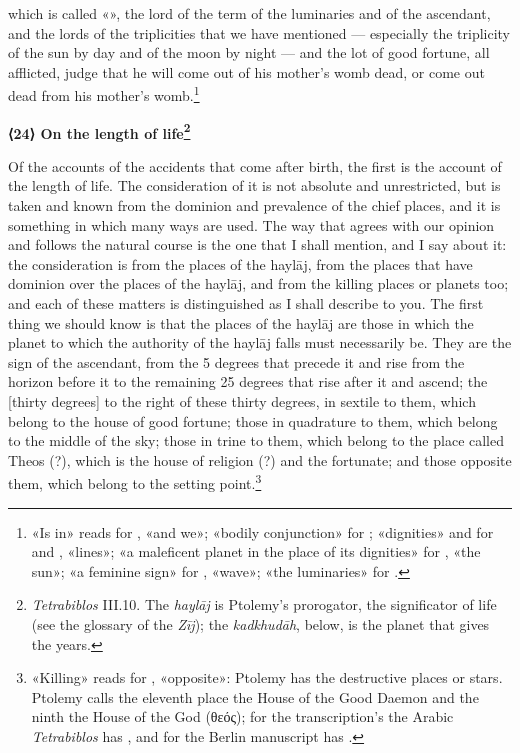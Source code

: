 \documentclass[11pt]{article}
\newcommand{\Fol}[1]{\marginpar{\footnotesize\color{gray}f.\,#1}}
\newcommand{\ChapterHead}[4]{\par\needspace{8\baselineskip}\bigskip\pdfbookmark[1]{#1}{ch-#2}\hypertarget{EN-K#2}{}%
 {\large\bfseries\interlinepenalty=10000 #1#4{\normalfont\normalsize#3}\par}\nobreak\medskip}
\begin{document}
which is called «», the lord of the term of the luminaries and of the ascendant, and the lords of the triplicities that we have mentioned — especially the triplicity of the sun by day and of the moon by night — and the lot of good fortune, all afflicted, judge that he will come out of his mother's womb dead, or come out dead from his mother's womb.\footnote{«Is in» reads  for , «and we»; «bodily conjunction»  for ; «dignities»  and  for  and , «lines»; «a maleficent planet in the place of its dignities»  for , «the sun»; «a feminine sign»  for , «wave»; «the luminaries»  for .}\par
\ChapterHead{{\mdseries ⟨}24{\mdseries ⟩} On the length of life}{24}{}{\footnote{\emph{Tetrabiblos} III.10. The \emph{haylāj} is Ptolemy's prorogator, the significator of life (see the glossary of the \emph{Zīj}); the \emph{kadkhudāh}, below, is the planet that gives the years.}}
\par \Fol{45v}Of the accounts of the accidents that come after birth, the first is the account of the length of life. The consideration of it is not absolute and unrestricted, but is taken and known from the dominion and prevalence of the chief places, and it is something in which many ways are used. The way that agrees with our opinion and follows the natural course is the one that I shall mention, and I say about it: the consideration is from the places of the haylāj, from the places that have dominion over the places of the haylāj, and from the killing places or planets too; and each of these matters is distinguished as I shall describe to you. The first thing we should know is that the places of the haylāj are those in which the planet to which the authority of the haylāj falls must necessarily be. They are the sign of the ascendant, from the 5 degrees that precede it and rise from the horizon before it to the remaining 25 degrees that rise after it and ascend; the [thirty degrees] to the right of these thirty degrees, in sextile to them, which belong to the house of good fortune; those in quadrature to them, which belong to the middle of the sky; those in trine to them, which belong to the place called Theos (?), which is the house of religion (?) and the fortunate; and those opposite them, which belong to the setting point.\footnote{«Killing» reads  for , «opposite»: Ptolemy has the destructive places or stars. Ptolemy calls the eleventh place the House of the Good Daemon and the ninth the House of the God (θεός); for the transcription's  the Arabic \emph{Tetrabiblos} has , and for  the Berlin manuscript has .}\par
\end{document}
